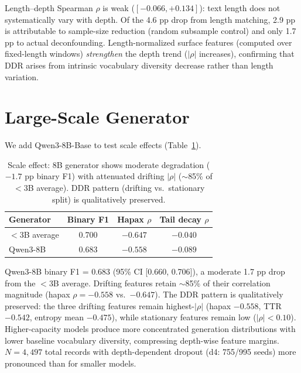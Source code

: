 \documentclass[11pt,twocolumn]{article}
\begin{document}
Length--depth Spearman $\rho$ is weak ($[-0.066, +0.134]$): text length does not systematically vary with depth.
Of the 4.6 pp drop from length matching, 2.9 pp is attributable to sample-size reduction (random subsample control) and only 1.7 pp to actual deconfounding.
Length-normalized surface features (computed over fixed-length windows) \emph{strengthen} the depth trend ($|\rho|$ increases), confirming that DDR arises from intrinsic vocabulary diversity decrease rather than length variation.


\section{Large-Scale Generator}
\label{sec:scale}

We add Qwen3-8B-Base to test scale effects (Table~\ref{tab:scale}).

\begin{table}[h]
\centering
\small
\begin{tabular}{lccc}
\toprule
\textbf{Generator} & \textbf{Binary F1} & \textbf{Hapax $\rho$} & \textbf{Tail decay $\rho$} \\
\midrule
$<$3B average & 0.700 & $-0.647$ & $-0.040$ \\
Qwen3-8B & 0.683 & $-0.558$ & $-0.089$ \\
\bottomrule
\end{tabular}
\caption{Scale effect: 8B generator shows moderate degradation ($-1.7$ pp binary F1) with attenuated drifting $|\rho|$ ($\sim$85\% of $<$3B average). DDR pattern (drifting vs.\ stationary split) is qualitatively preserved.}
\label{tab:scale}
\end{table}

Qwen3-8B binary F1 = 0.683 (95\% CI [0.660, 0.706]), a moderate 1.7 pp drop from the $<$3B average.
Drifting features retain $\sim$85\% of their correlation magnitude (hapax $\rho = -0.558$ vs.\ $-0.647$).
The DDR pattern is qualitatively preserved: the three drifting features remain highest-$|\rho|$ (hapax $-0.558$, TTR $-0.542$, entropy mean $-0.475$), while stationary features remain low ($|\rho| < 0.10$).
Higher-capacity models produce more concentrated generation distributions with lower baseline vocabulary diversity, compressing depth-wise feature margins.
$N = 4{,}497$ total records with depth-dependent dropout (d4: 755/995 seeds) more pronounced than for smaller models.
\end{document}
